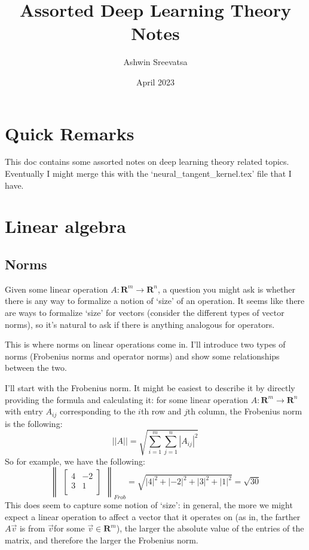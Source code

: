 \documentclass[answers,12pt]{exam}
\title{Assorted Deep Learning Theory Notes}
\author{Ashwin Sreevatsa}
\date{April 2023}
\begin{document}
\maketitle

\section*{Quick Remarks}
This doc contains some assorted notes on deep learning theory related topics.
Eventually I might merge this with the `neural\_tangent\_kernel.tex' file that I have.

\section{Linear algebra}
\subsection{Norms}
Given some linear operation $A: \mathbf{R}^m \to \mathbf{R}^n$, a question you might ask is whether there is any way to formalize a notion of `size' of an operation.
It seems like there are ways to formalize `size' for vectors (consider the different types of vector norms), so it's natural to ask if there is anything analogous for operators.

This is where norms on linear operations come in.
I'll introduce two types of norms (Frobenius norms and operator norms) and show some relationships between the two.

I'll start with the Frobenius norm.
It might be easiest to describe it by directly providing the formula and calculating it:
for some linear operation $A: \mathbf{R}^m \to \mathbf{R}^n$ with entry $A_{ij}$ corresponding to the $i$th row and $j$th column, the Frobenius norm is the following:
\[
    ||A|| = \sqrt{\sum_{i=1}^{m}\sum_{j=1}^{n} |A_{ij}|^2 }    
\]
So for example, we have the following:
\[
    \begin{Vmatrix}\begin{bmatrix} 4 & -2 \\ 3 & 1 \\ \end{bmatrix} \end{Vmatrix}_{Frob}
    = \sqrt{|4|^2 + |-2|^2 + |3|^2 + |1|^2}
    = \sqrt{30}
\]
This does seem to capture some notion of `size': 
in general, the more we might expect a linear operation to affect a vector that it operates on (as in, the farther $A \vec{v}$ is from $\vec{v}$for some $\vec{v} \in \mathbf{R}^m$), the larger the absolute value of the entries of the matrix, and therefore the larger the Frobenius norm.
\end{document}
